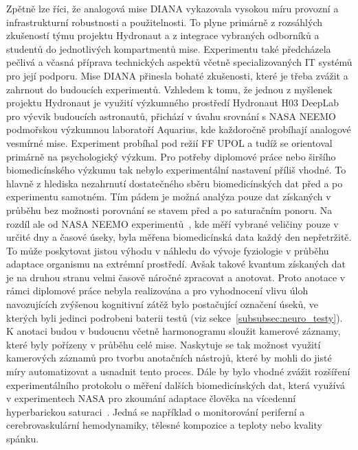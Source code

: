 Zpětně lze říci, že analogová mise DIANA vykazovala vysokou míru provozní a
infrastrukturní robustnosti a použitelnosti. To plyne primárně z rozsáhlých
zkušeností týmu projektu Hydronaut a z integrace vybraných odborníků a studentů
do jednotlivých kompartmentů mise. Experimentu také předcházela pečlivá a včasná
příprava technických aspektů včetně specializovaných IT systémů pro její
podporu. Mise DIANA přinesla bohaté zkušenosti, které je třeba zvážit a zahrnout
do budoucích experimentů. Vzhledem k tomu, že jednou z myšlenek projektu
Hydronaut je využití výzkumného prostředí Hydronaut H03 DeepLab pro výcvik
budoucích astronautů, přichází v úvahu srovnání s \gls{NASA} \gls{NEEMO}
podmořskou výzkumnou laboratoří Aquarius, kde každoročně probíhají analogové
vesmírné mise. Experiment probíhal pod režií \gls{FF UPOL} a tudíž se orientoval
primárně na psychologický výzkum. Pro potřeby diplomové práce nebo širšího
biomedicínského výzkumu tak nebylo experimentální nastavení příliš vhodné. To
hlavně z hlediska nezahrnutí dostatečného sběru biomedicínských dat před a po
experimentu samotném. Tím pádem je možná analýza pouze dat získaných v průběhu
bez možnosti porovnání se stavem před a po saturačním ponoru. Na rozdíl ale od
\gls{NASA} \gls{NEEMO} experimentů~\cite{koutnik2021neemo}, kde měří vybrané
veličiny pouze v určité dny a časové úseky, byla měřena biomedicínská data každý
den nepřetržitě. To může poskytovat jistou výhodu v náhledu do vývoje fyziologie
v průběhu adaptace organismu na extrémní prostředí. Avšak takové kvantum
získaných dat je na druhou stranu velmi časově náročné zpracovat a anotovat.
Proto anotace v rámci diplomové práce nebyla realizována a pro vyhodnocení vlivu
úloh navozujících zvýšenou kognitivní zátěž bylo postačující označení úseků, ve
kterých byli jedinci podrobeni baterii testů (viz
sekce~\ref{subsubsec:neuro_testy}). K anotaci budou v budoucnu včetně
harmonogramu sloužit kamerové záznamy, které byly pořízeny v průběhu celé mise.
Naskytuje se tak možnost využití kamerových záznamů pro tvorbu anotačních
nástrojů, které by mohli do jisté míry automatizovat a usnadnit tento proces.
Dále by bylo vhodné zvážit rozšíření experimentálního protokolu o měření dalších
biomedicínských dat, která využívá v experimentech \gls{NASA} pro zkoumání
adaptace člověka na vícedenní hyperbarickou saturaci~\cite{koutnik2021neemo}.
Jedná se například o monitorování periferní a cerebrovaskulární hemodynamiky,
tělesné kompozice a teploty nebo kvality spánku.

